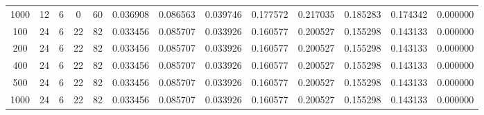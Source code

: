\begin{table}[h]
\begin{tabular}{ccccccccccccc}
1000 & 12 & 6 & 0 & 60 & 0.036908 & 0.086563 & 0.039746 & 0.177572 & 0.217035 & 0.185283 & 0.174342 & 0.000000 \\
100 & 24 & 6 & 22 & 82 & 0.033456 & 0.085707 & 0.033926 & 0.160577 & 0.200527 & 0.155298 & 0.143133 & 0.000000 \\
200 & 24 & 6 & 22 & 82 & 0.033456 & 0.085707 & 0.033926 & 0.160577 & 0.200527 & 0.155298 & 0.143133 & 0.000000 \\
400 & 24 & 6 & 22 & 82 & 0.033456 & 0.085707 & 0.033926 & 0.160577 & 0.200527 & 0.155298 & 0.143133 & 0.000000 \\
500 & 24 & 6 & 22 & 82 & 0.033456 & 0.085707 & 0.033926 & 0.160577 & 0.200527 & 0.155298 & 0.143133 & 0.000000 \\
1000 & 24 & 6 & 22 & 82 & 0.033456 & 0.085707 & 0.033926 & 0.160577 & 0.200527 & 0.155298 & 0.143133 & 0.000000 \\
\bottomrule
\end{tabular}
\end{table}
